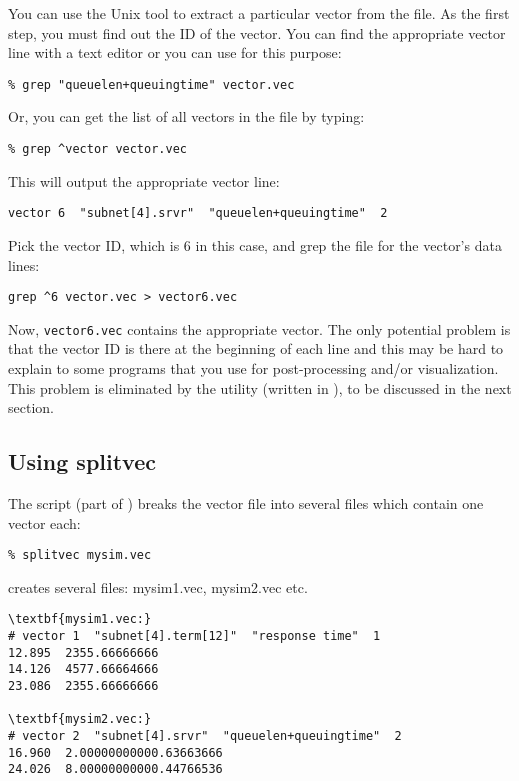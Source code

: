 You can use the Unix  tool to extract a particular vector
from the file. As the first step, you must find out the ID of the
vector. You can find the appropriate vector line with a text editor or
you can use  for this purpose:

\begin{verbatim}
% grep "queuelen+queuingtime" vector.vec
\end{verbatim}

Or, you can get the list of all vectors in the file by typing:

\begin{verbatim}
% grep ^vector vector.vec
\end{verbatim}

This will output the appropriate vector line:

\begin{verbatim}
vector 6  "subnet[4].srvr"  "queuelen+queuingtime"  2
\end{verbatim}

Pick the vector ID, which is 6 in this case, and grep the file
for the vector's data lines:

\begin{verbatim}
grep ^6 vector.vec > vector6.vec
\end{verbatim}


Now, \texttt{vector6.vec} contains the appropriate vector. The only
potential problem is that the vector ID is there at the beginning of
each line and this may be hard to explain to some programs that you
use for post-processing and/or visualization. This problem is
eliminated by the {\opp}  utility (written in
), to be discussed in the next section.




\subsection{Using splitvec}

The  script (part of {\opp}) breaks the vector file
into several files which contain one vector each:

\begin{verbatim}
% splitvec mysim.vec
\end{verbatim}


creates several files: mysim1.vec, mysim2.vec etc.

\begin{Verbatim}[commandchars=\\\{\}]
\textbf{mysim1.vec:}
# vector 1  "subnet[4].term[12]"  "response time"  1
12.895  2355.66666666
14.126  4577.66664666
23.086  2355.66666666

\textbf{mysim2.vec:}
# vector 2  "subnet[4].srvr"  "queuelen+queuingtime"  2
16.960  2.00000000000.63663666
24.026  8.00000000000.44766536
\end{Verbatim}


